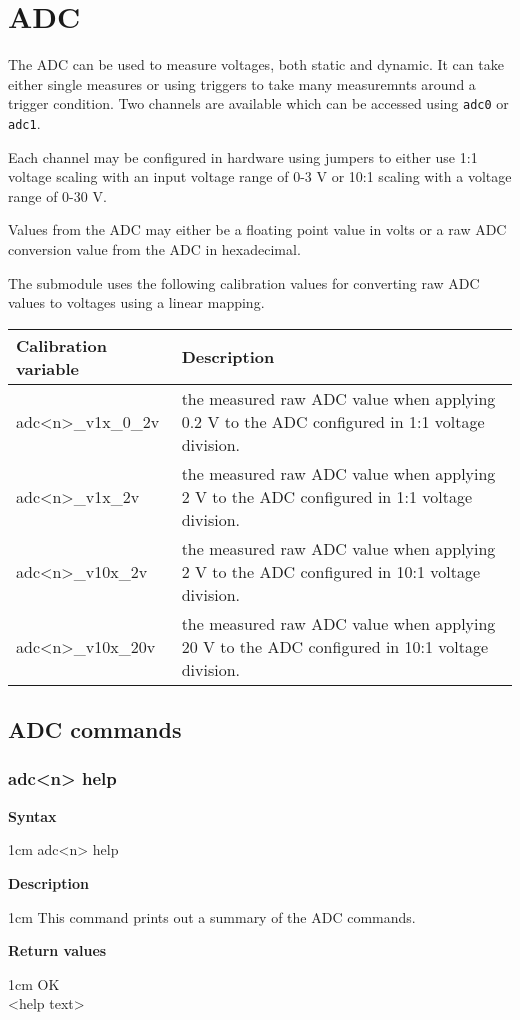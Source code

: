 \documentclass{article}[a4paper]
\begin{document}
\section{ADC}

The ADC can be used to measure voltages, both static and dynamic. It can take
either single measures or using triggers to take many measuremnts around a
trigger condition. Two channels are available
which can be accessed using \texttt{adc0} or \texttt{adc1}.

Each channel may be configured in hardware using jumpers to either use 1:1
voltage scaling with an input voltage range of 0-3 V or 10:1 scaling with a
voltage range of 0-30 V.

Values from the ADC may either be a floating point value in volts or a raw ADC
conversion value from the ADC in hexadecimal.

The submodule uses the following calibration values for converting raw ADC values to
voltages using a linear mapping.

\medskip

\noindent
\begin{tabularx}{\textwidth}{|p{4cm}|X|}
\hline
Calibration variable & Description \\
\hline
adc<n>\_v1x\_0\_2v & the measured raw ADC value when applying 0.2 V to the
ADC configured in 1:1 voltage division. \\
\hline
adc<n>\_v1x\_2v & the measured raw ADC value when applying 2 V to the
ADC configured in 1:1 voltage division. \\
\hline
adc<n>\_v10x\_2v & the measured raw ADC value when applying 2 V to the
ADC configured in 10:1 voltage division. \\
\hline
adc<n>\_v10x\_20v & the measured raw ADC value when applying 20 V to the
ADC configured in 10:1 voltage division. \\
\hline
\end{tabularx}

\subsection{ADC commands}
\subsubsection{adc<n> help}
\begin{tcolorbox}
	{\bf Syntax}

	 1cm \dimexpr\linewidth-2cm\relax
	adc<n> help

	\medskip
	{\bf Description}

	 1cm \dimexpr\linewidth-2cm\relax
	This command prints out a summary of the ADC commands.

	\medskip
	{\bf Return values}

	 1cm \dimexpr\linewidth-2cm\relax
	OK \\
	<help text>
\end{tcolorbox}
\end{document}
